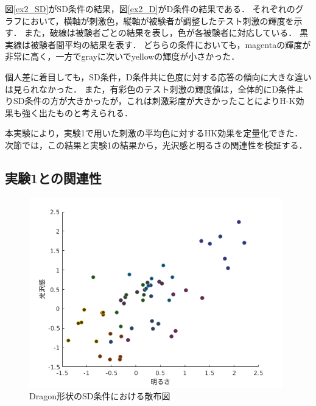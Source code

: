             図\ref{ex2_SD}がSD条件の結果，図\ref{ex2_D}がD条件の結果である．
            それぞれのグラフにおいて，横軸が刺激色，縦軸が被験者が調整したテスト刺激の輝度を示す．
            また，破線は被験者ごとの結果を表し，色が各被験者に対応している．
            黒実線は被験者間平均の結果を表す．
            どちらの条件においても，magentaの輝度が非常に高く，一方でgrayに次いでyellowの輝度が小さかった．

            個人差に着目しても，SD条件，D条件共に色度に対する応答の傾向に大きな違いは見られなかった．
            また，有彩色のテスト刺激の輝度値は，全体的にD条件よりSD条件の方が大きかったが，これは刺激彩度が大きかったことによりH-K効果も強く出たものと考えられる．

            本実験により，実験1で用いた刺激の平均色に対するHK効果を定量化できた．
            次節では，この結果と実験1の結果から，光沢感と明るさの関連性を検証する．

    \newpage
        \subsection{実験1との関連性}

            \begin{figure}[h]
                \centering
                \includegraphics[width=11.0cm]{./img/ex3_DSD.png}
                \caption{Dragon形状のSD条件における散布図}
                \label{ex3_DSD}
            \end{figure}

